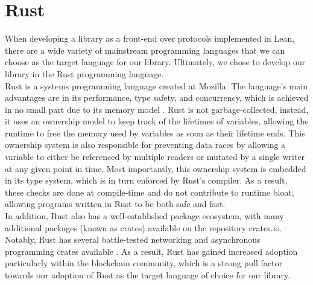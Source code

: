 \section{Rust} 
When developing a library as a front-end over protocols implemented in Lean, there are a wide variety of mainstream programming languages that we can choose as the target language for our library. Ultimately, we chose to develop our library in the Rust programming language.
\\

Rust is a systems programming language created at Mozilla. The language's main advantages are in its performance, type safety, and concurrency, which is achieved in no small part due to its memory model \cite{rustlang}. Rust is not garbage-collected, instead, it uses an ownership model to keep track of the lifetimes of variables, allowing the runtime to free the memory used by variables as soon as their lifetime ends. This ownership system is also responsible for preventing data races by allowing a variable to either be referenced by multiple readers or mutated by a single writer at any given point in time. Most importantly, this ownership system is embedded in its type system, which is in turn enforced by Rust's compiler. As a result, these checks are done at compile-time and do not contribute to runtime bloat, allowing programs written in Rust to be both safe and fast. 
\\

In addition, Rust also has a well-established package ecosystem, with many additional packages (known as crates) available on the repository crates.io. Notably, Rust has several battle-tested networking and asynchronous programming crates available \cite{tokio, libp2p}. As a result, Rust has gained increased adoption particularly within the blockchain community,  which is a strong pull factor towards our adoption of Rust as the target language of choice for our library.
\\

~\\